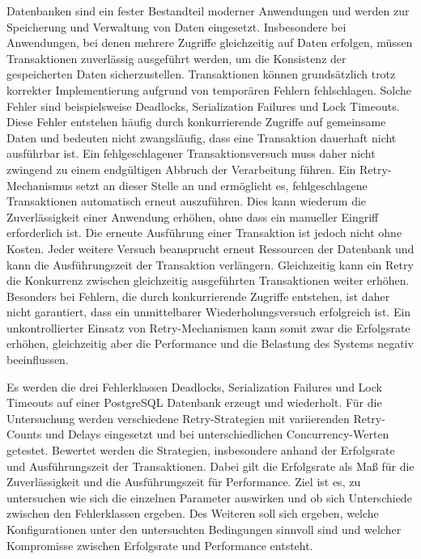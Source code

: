 
Datenbanken sind ein fester Bestandteil moderner Anwendungen und werden zur Speicherung und Verwaltung von Daten
eingesetzt.
Insbesondere bei Anwendungen, bei denen mehrere Zugriffe gleichzeitig auf Daten erfolgen, müssen Transaktionen
zuverlässig ausgeführt werden, um die Konsistenz der gespeicherten Daten sicherzustellen.
Transaktionen können grundsätzlich trotz korrekter Implementierung aufgrund von temporären Fehlern
fehlschlagen.
Solche Fehler sind beispielsweise Deadlocks, Serialization Failures und Lock Timeouts.
Diese Fehler entstehen häufig durch konkurrierende Zugriffe auf gemeinsame Daten und bedeuten nicht zwangsläufig,
dass eine Transaktion dauerhaft nicht ausführbar ist.
Ein fehlgeschlagener Transaktionsversuch muss daher nicht zwingend zu einem endgültigen Abbruch der Verarbeitung
führen.
Ein Retry-Mechanismus setzt an dieser Stelle an und ermöglicht es, fehlgeschlagene Transaktionen automatisch
erneut auszuführen.
Dies kann wiederum die Zuverlässigkeit einer Anwendung erhöhen, ohne dass ein manueller Eingriff erforderlich ist.
Die erneute Ausführung einer Transaktion ist jedoch nicht ohne Kosten.
Jeder weitere Versuch beansprucht erneut Ressourcen der Datenbank und kann die Ausführungszeit der Transaktion
verlängern.
Gleichzeitig kann ein Retry die Konkurrenz zwischen gleichzeitig ausgeführten Transaktionen weiter erhöhen.
Besonders bei Fehlern, die durch konkurrierende Zugriffe entstehen, ist daher nicht garantiert, dass ein
unmittelbarer Wiederholungsversuch erfolgreich ist.
Ein unkontrollierter Einsatz von Retry-Mechanismen kann somit zwar die Erfolgsrate erhöhen, gleichzeitig aber die
Performance und die Belastung des Systems negativ beeinflussen.

Es werden die drei Fehlerklassen Deadlocks, Serialization Failures und Lock Timeouts auf einer PostgreSQL Datenbank
erzeugt und wiederholt.
Für die Untersuchung werden verschiedene Retry-Strategien mit variierenden Retry-Counts und Delays eingesetzt und
bei unterschiedlichen Concurrency-Werten getestet.
Bewertet werden die Strategien, insbesondere anhand der Erfolgsrate und Ausführungszeit der Transaktionen.
Dabei gilt die Erfolgsrate als Maß für die Zuverlässigkeit und die Ausführungszeit für Performance.
Ziel ist es, zu untersuchen wie sich die einzelnen Parameter auswirken und ob sich Unterschiede zwischen den
Fehlerklassen ergeben.
Des Weiteren soll sich ergeben, welche Konfigurationen unter den untersuchten Bedingungen sinnvoll sind und welcher
Kompromisse zwischen Erfolgsrate und Performance entsteht.

